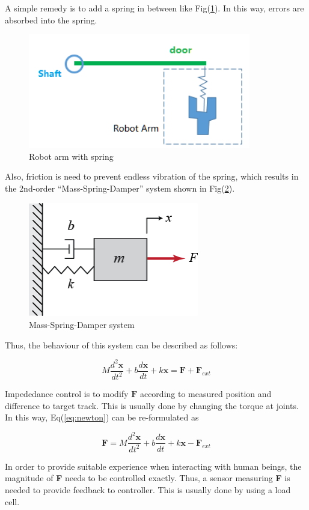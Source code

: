 \documentclass[paper=a4, fontsize=11pt]{scrartcl} %
\numberwithin{equation}{section} %
\numberwithin{figure}{section} %
\numberwithin{table}{section} %
\begin{document}
\begin{itemize}
			A simple remedy is to add a spring in between like Fig(\ref{fig:spring}). In this way, errors are absorbed into the spring.
			
			\begin{figure}[!ht]
				\centering
				\includegraphics[height=5cm]{../pic/robot.png}
				\caption{Robot arm with spring}
				\label{fig:spring}
			\end{figure}	
		
			Also, friction is need to prevent endless vibration of the spring, which results in the 2nd-order ``Mass-Spring-Damper'' system shown in Fig(\ref{fig:arm}).
			
			\begin{figure}[!ht]
				\centering
				\includegraphics[height=5cm]{../pic/msd.png}
				\caption{Mass-Spring-Damper system}
				\label{fig:arm}
			\end{figure}
		
			Thus, the behaviour of this system can be described as follows:
			
			\begin{equation}
				M\frac{d^2 \textbf{x}}{d t^2} + b\frac{d \textbf{x}}{d t} + k \textbf{x} = \textbf{F} + \textbf{F}_{ext}\label{eq:newton}
			\end{equation}
			
			Impededance control is to modify $\textbf{F}$ according to measured position and difference to target track\cite{ref1}. This is usually done by changing the torque at joints. In this way, Eq(\ref{eq:newton}) can be re-formulated as
			
			\begin{equation}
				\textbf{F} = M\frac{d^2 \textbf{x}}{d t^2} + b\frac{d \textbf{x}}{d t} + k \textbf{x} - \textbf{F}_{ext}\label{eq:impedence}
			\end{equation}
			
			In order to provide suitable experience when interacting with human beings, the magnitude of \textbf{F} needs to be controlled exactly. Thus, a sensor measuring \textbf{F} is needed to provide feedback to controller. This is usually done by using a load cell.
		
	\end{itemize}
\end{document}
